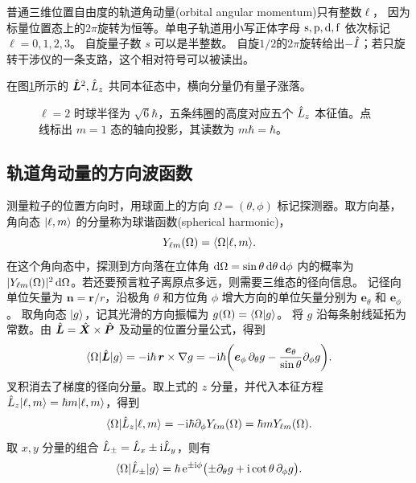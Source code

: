 普通三维位置自由度的轨道角动量(orbital angular momentum)只有整数$\ell$，
因为标量位置态上的$2\pi$旋转为恒等。单电子轨道用小写正体字母 $\mathrm{s},\mathrm{p},\mathrm{d},\mathrm{f}$ 依次标记 $\ell = 0,1,2,3$。
自旋量子数 $s$ 可以是半整数。
自旋$1/2$的$2\pi$旋转给出$-\hat{I}$；若只旋转干涉仪的一条支路，这个相对符号可以被读出。

在图\ref{fig:angular-projection}所示的 $\hat{\bm{L}}^2,\hat{L}_z$ 共同本征态中，横向分量仍有量子涨落。
\begin{figure}[htbp]
    \centering{}
    \caption{$\ell = 2$ 时球半径为 $\sqrt{6}\hbar$，五条纬圈的高度对应五个 $\hat{L}_z$ 本征值。点线标出 $m = 1$ 态的轴向投影，其读数为 $m\hbar = \hbar$。}\label{fig:angular-projection}
\end{figure}

\subsection{轨道角动量的方向波函数}
\label{ss:qm-spherical-harmonics}
测量粒子的位置方向时，用球面上的方向 $\Omega = (\theta,\phi)$ 标记探测器。取方向基，角向态 $\lvert\ell,m\rangle$ 的分量称为球谐函数(spherical harmonic)，
\begin{equation}\label{eq:qm-direction-amplitude}
    Y_{\ell m}(\Omega) = \langle\Omega\vert\ell,m\rangle .
\end{equation}
在这个角向态中，探测到方向落在立体角 $\mathop{}\!\mathrm{d}\Omega = \sin\theta\mathop{}\!\mathrm{d}\theta\mathop{}\!\mathrm{d}\phi$ 内的概率为 $\lvert Y_{\ell m}(\Omega)\rvert^2\mathop{}\!\mathrm{d}\Omega$。若还要预言粒子离原点多远，则需要三维态的径向信息。
记径向单位矢量为 $\bm n = \bm r/r$，沿极角 $\theta$ 和方位角 $\phi$ 增大方向的单位矢量分别为 $\bm e_\theta$ 和 $\bm e_\phi$。
取角向态 $\lvert g\rangle$，记其光滑的方向振幅为 $g(\Omega) = \langle\Omega\vert g\rangle$。
将 $g$ 沿每条射线延拓为常数。由 $\hat{\bm{L}} = \hat{\bm{X}} \times \hat{\bm{P}}$ 及动量的位置分量公式，得到
\begin{equation}
    \langle\Omega\vert\hat{\bm{L}}\vert g\rangle = -\mathrm{i}\hbar\,\bm r \times \nabla g
       = -\mathrm{i}\hbar\biggl(\bm e_\phi\,\partial_\theta g
            - \frac{\bm e_\theta}{\sin\theta}\partial_\phi g\biggr).
\end{equation}
叉积消去了梯度的径向分量。取上式的 $z$ 分量，并代入本征方程 $\hat{L}_z\lvert\ell,m\rangle = \hbar m\lvert\ell,m\rangle$，得到
\begin{equation}\label{eq:qm-angular-azimuth}
    \langle\Omega\vert\hat{L}_z\vert\ell,m\rangle
    = -\mathrm{i}\hbar\partial_\phi Y_{\ell m}(\Omega) = \hbar mY_{\ell m}(\Omega).
\end{equation}
取 $x,y$ 分量的组合 $\hat{L}_\pm = \hat{L}_x \pm \mathrm{i}\hat{L}_y$，则有
\begin{equation}
    \langle\Omega\vert\hat{L}_\pm\vert g\rangle
        = \hbar\mathop{}\!\mathrm{e}^{\pm\mathrm{i}\phi}\bigl(\pm\partial_\theta g + \mathrm{i}\cot\theta\,\partial_\phi g\bigr).
\end{equation}
